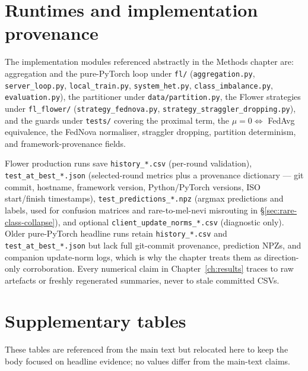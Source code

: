 \documentclass[11pt,a4paper]{report}
\begin{document}
\section{Runtimes and implementation provenance}
\label{app:provenance}

The implementation modules referenced abstractly in the Methods chapter are:
aggregation and the pure-PyTorch loop under \texttt{fl/} (\texttt{aggregation.py},
\texttt{server\_loop.py}, \texttt{local\_train.py}, \texttt{system\_het.py},
\texttt{class\_imbalance.py}, \texttt{evaluation.py}), the partitioner under
\texttt{data/partition.py}, the Flower strategies under \texttt{fl\_flower/}
(\texttt{strategy\_fednova.py}, \texttt{strategy\_straggler\_dropping.py}), and the
guards under \texttt{tests/} covering the proximal term, the
$\mu = 0 \Leftrightarrow$ FedAvg equivalence, the FedNova normaliser, straggler
dropping, partition determinism, and framework-provenance fields.

Flower production runs save \texttt{history\_*.csv} (per-round validation),
\texttt{test\_at\_best\_*.json} (selected-round metrics plus a provenance
dictionary --- git commit, hostname, framework version, Python/PyTorch versions,
ISO start/finish timestamps), \texttt{test\_predictions\_*.npz} (argmax
predictions and labels, used for confusion matrices and rare-to-mel-nevi
misrouting in §\ref{sec:rare-class-collapse}), and optional
\texttt{client\_update\_norms\_*.csv} (diagnostic only). Older pure-PyTorch
headline runs retain \texttt{history\_*.csv} and \texttt{test\_at\_best\_*.json}
but lack full git-commit provenance, prediction NPZs, and companion update-norm
logs, which is why the chapter treats them as direction-only corroboration. Every
numerical claim in Chapter~\ref{ch:results} traces to raw artefacts or freshly
regenerated summaries, never to stale committed CSVs.

\section{Supplementary tables}
\label{app:supp-tables}

These tables are referenced from the main text but relocated here to keep the
body focused on headline evidence; no values differ from the main-text claims.
\end{document}
